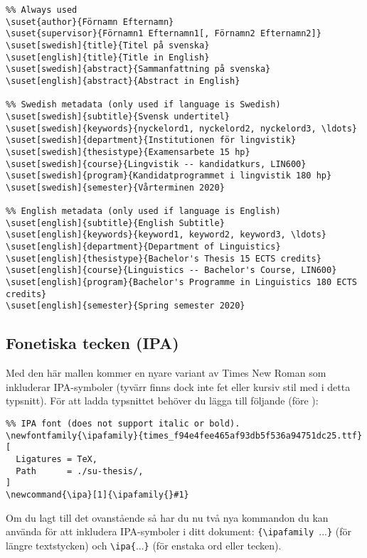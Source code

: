 \begin{verbatim}
%% Always used
\suset{author}{Förnamn Efternamn}
\suset{supervisor}{Förnamn1 Efternamn1[, Förnamn2 Efternamn2]}
\suset[swedish]{title}{Titel på svenska}
\suset[english]{title}{Title in English}
\suset[swedish]{abstract}{Sammanfattning på svenska}
\suset[english]{abstract}{Abstract in English}

%% Swedish metadata (only used if language is Swedish)
\suset[swedish]{subtitle}{Svensk undertitel}
\suset[swedish]{keywords}{nyckelord1, nyckelord2, nyckelord3, \ldots}
\suset[swedish]{department}{Institutionen för lingvistik}
\suset[swedish]{thesistype}{Examensarbete 15 hp}
\suset[swedish]{course}{Lingvistik -- kandidatkurs, LIN600}
\suset[swedish]{program}{Kandidatprogrammet i lingvistik 180 hp}
\suset[swedish]{semester}{Vårterminen 2020}

%% English metadata (only used if language is English)
\suset[english]{subtitle}{English Subtitle}
\suset[english]{keywords}{keyword1, keyword2, keyword3, \ldots}
\suset[english]{department}{Department of Linguistics}
\suset[english]{thesistype}{Bachelor's Thesis 15 ECTS credits}
\suset[english]{course}{Linguistics -- Bachelor's Course, LIN600}
\suset[english]{program}{Bachelor's Programme in Linguistics 180 ECTS credits}
\suset[english]{semester}{Spring semester 2020}
\end{verbatim}


\subsection{Fonetiska tecken (IPA)}
\label{ipa}

Med den här mallen kommer en nyare variant av Times New Roman som inkluderar
IPA-symboler (tyvärr finns dock inte fet eller kursiv stil med i detta
typsnitt). För att ladda typsnittet behöver du lägga till följande (före
\verb||):

\medskip
\begin{verbatim}
%% IPA font (does not support italic or bold).
\newfontfamily{\ipafamily}{times_f94e4fee465af93db5f536a94751dc25.ttf}[
  Ligatures = TeX,
  Path      = ./su-thesis/,
]
\newcommand{\ipa}[1]{\ipafamily{}#1}
\end{verbatim}
\medskip

Om du lagt till det ovanstående så har du nu två nya kommandon du kan använda
för att inkludera IPA-symboler i ditt dokument:
\texttt{\{\textbackslash{}ipafamily~}...\texttt{\}} (för längre textstycken)
och \texttt{\textbackslash{}ipa\{}...\texttt{\}} (för enstaka ord eller
tecken).

